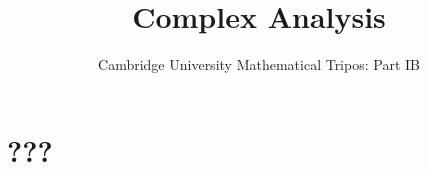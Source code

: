 \documentclass{article}
\title{Complex Analysis}
\author{Cambridge University Mathematical Tripos: Part IB}
\begin{document}
\maketitle

\tableofcontentsnewpage{}

\section{???}

\end{document}
